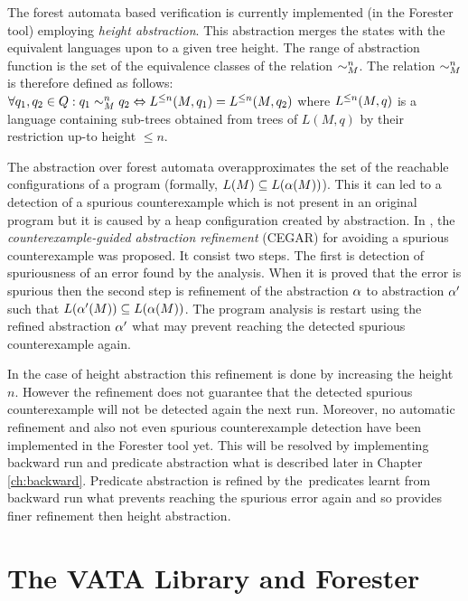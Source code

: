 The forest automata based verification is currently implemented (in the Forester tool)
employing \emph{height abstraction}.
This abstraction merges the states with the equivalent
languages upon to a given tree height.
The range of abstraction function is the set of the equivalence classes of the relation $\sim^n_M$.
The relation $\sim^n_M$ is therefore defined as follows:
$\forall q_1,q_2 \in Q: q_1 \sim^n_M q_2 \Leftrightarrow L^{\leq n}(M,q_1) = L^{\leq n}(M,q_2)$ where
$L^{\leq n}(M,q)$ is a language containing sub-trees obtained from trees of $L(M,q)$
by their restriction up-to height $\leq n$.

The abstraction over forest automata overapproximates the set of the reachable
configurations of a program (formally, $L(M) \subseteq L(\alpha(M))$).
This it can led to a detection of a spurious counterexample which is not present
in an original program but it is caused by a heap configuration created by abstraction.
In \cite{cegar}, the \emph{counterexample-guided abstraction refinement} (CEGAR)
for avoiding a spurious counterexample was proposed.
It consist two steps.
The first is detection of spuriousness of an error found by the analysis.
When it is proved that the error is spurious then
the second step is refinement of the abstraction $\alpha$
to abstraction $\alpha'$ such that $L(\alpha'(M)) \subseteq L(\alpha(M))$.
The program analysis is restart using the refined abstraction $\alpha'$
what may prevent reaching the detected spurious counterexample again.

In the case of height abstraction this refinement is done by increasing the height $n$.
However the refinement does not guarantee that the detected spurious counterexample will not
be detected again the next run.
Moreover, no automatic refinement and also not even spurious counterexample detection
have been implemented in the Forester tool yet.
This will be resolved by implementing backward run and
predicate abstraction what is described later in Chapter \ref{ch:backward}.
Predicate abstraction is refined by the~predicates learnt from backward run
what prevents reaching the spurious error again and so provides finer refinement then height
abstraction.

\chapter{The VATA Library and Forester}
\label{ch:tools}

